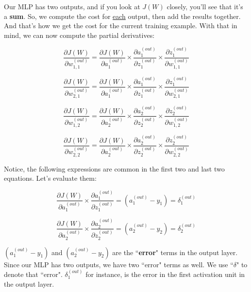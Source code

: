 \documentclass[12pt, letterpaper]{article}
\begin{document}
Our MLP has two outputs, and if you look at $J(W)$ 
closely, you'll see that it's a \textbf{sum}. So, we compute 
the cost for \underline{each} output, then add the results together. 
And that's how we get the cost for the current training
example. With that in mind, we can now compute the partial
derivatives:

\vspace{5mm} %

\[
    \frac{\partial J(W)}{\partial w_{1,1}^{(out)}} = 
    \frac{\partial J(W)}{\partial a_{1}^{(out)}} \times
    \frac{\partial a_{1}^{(out)}}{\partial z_{1}^{(out)}} \times
    \frac{\partial z_{1}^{(out)}}{\partial w_{1,1}^{(out)}}
\]

\[
    \frac{\partial J(W)}{\partial w_{2,1}^{(out)}} = 
    \frac{\partial J(W)}{\partial a_{1}^{(out)}} \times
    \frac{\partial a_{1}^{(out)}}{\partial z_{1}^{(out)}} \times
    \frac{\partial z_{1}^{(out)}}{\partial w_{2,1}^{(out)}}
\]

\[
    \frac{\partial J(W)}{\partial w_{1,2}^{(out)}} = 
    \frac{\partial J(W)}{\partial a_{2}^{(out)}} \times
    \frac{\partial a_{2}^{(out)}}{\partial z_{2}^{(out)}} \times
    \frac{\partial z_{2}^{(out)}}{\partial w_{1,2}^{(out)}}
\]

\[
    \frac{\partial J(W)}{\partial w_{2,2}^{(out)}} = 
    \frac{\partial J(W)}{\partial a_{2}^{(out)}} \times
    \frac{\partial a_{2}^{(out)}}{\partial z_{2}^{(out)}} \times
    \frac{\partial z_{2}^{(out)}}{\partial w_{2,2}^{(out)}}
\]

\vspace{5mm} %

Notice, the following expressions are common in the first two and
last two equations. Let's evaluate them:

\[
    \frac{\partial J(W)}{\partial a_{1}^{(out)}} \times
    \frac{\partial a_{1}^{(out)}}{\partial z_{1}^{(out)}} = 
    (a_{1}^{(out)} - y_1) = \delta_1^{(out)}
\]

\[
    \frac{\partial J(W)}{\partial a_{2}^{(out)}} \times
    \frac{\partial a_{2}^{(out)}}{\partial z_{2}^{(out)}} = 
    (a_{2}^{(out)} - y_2) = \delta_2^{(out)}
\]

\vspace{5mm} %

$(a_{1}^{(out)} - y_1)$ and $(a_{2}^{(out)} - y_2)$ are the 
``\textbf{error}" terms in the output layer. Since our MLP
has two outputs, we have two ``error" terms as well. We use 
``$\delta$" to denote that ``error". $\delta_1^{(out)}$ for 
instance, is the error in the first activation unit in the 
output layer.
\end{document}
